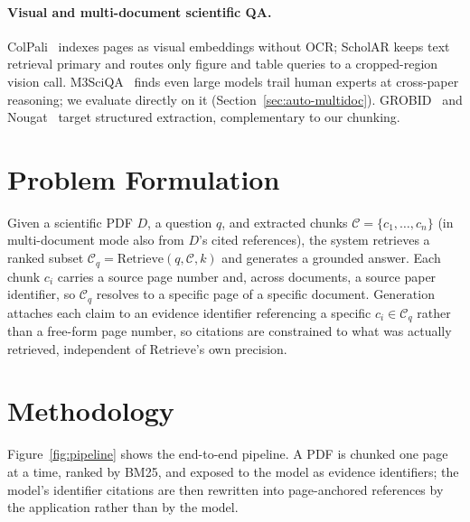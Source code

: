 \documentclass[11pt,letterpaper]{article}
\begin{document}
\paragraph{Visual and multi-document scientific QA.}
ColPali~\citep{faysse2024colpali} indexes pages as visual embeddings without OCR; ScholAR keeps
text retrieval primary and routes only figure and table queries to a cropped-region vision call.
M3SciQA~\citep{li2024m3sciqa} finds even large models trail human experts at cross-paper reasoning;
we evaluate directly on it (Section~\ref{sec:auto-multidoc}). GROBID~\citep{lopez2009grobid} and
Nougat~\citep{blecher2023nougat} target structured extraction, complementary to our chunking.

\section{Problem Formulation}
Given a scientific PDF $D$, a question $q$, and extracted chunks
$\mathcal{C} = \{c_1, \ldots, c_n\}$ (in multi-document mode also from $D$'s cited references), the
system retrieves a ranked subset $\mathcal{C}_q = \mathrm{Retrieve}(q, \mathcal{C}, k)$ and
generates a grounded answer. Each chunk $c_i$ carries a source page number and, across documents, a
source paper identifier, so $\mathcal{C}_q$ resolves to a specific page of a specific document.
Generation attaches each claim to an evidence identifier referencing a specific
$c_i \in \mathcal{C}_q$ rather than a free-form page number, so citations are constrained to what
was actually retrieved, independent of $\mathrm{Retrieve}$'s own precision.

\section{Methodology}
Figure~\ref{fig:pipeline} shows the end-to-end pipeline. A PDF is chunked one page
at a time, ranked by BM25, and exposed to the model as evidence identifiers; the
model's identifier citations are then rewritten into page-anchored references by the
application rather than by the model.
\end{document}
